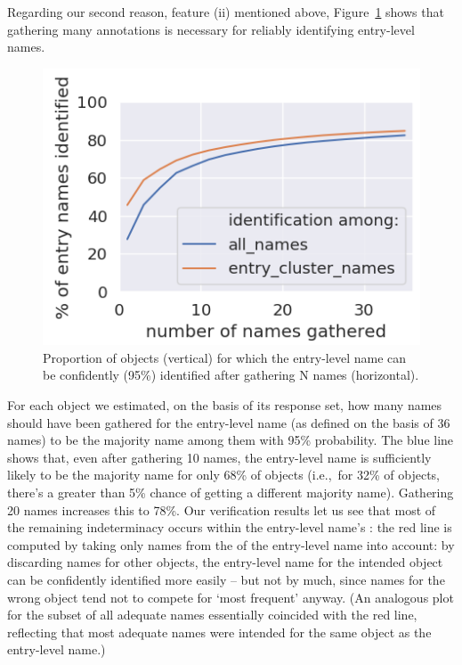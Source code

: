 Regarding our second reason, feature (ii) mentioned above, Figure~\ref{fig:entry-level-name-stability} shows that gathering many annotations is necessary for reliably identifying entry-level names.
\begin{figure}[t]
	\includegraphics[width=.9\columnwidth]{images/stability_analytic.png}
	\caption{Proportion of objects (vertical) for which the entry-level name can be confidently (95\%) identified after gathering N names (horizontal).}
	\label{fig:entry-level-name-stability}
\end{figure}
For each object we estimated, on the basis of its \mn response set, how many names should have been gathered for the entry-level name (as defined on the basis of 36 names) to be the majority name among them with 95\% probability.
The blue line shows that, even after gathering 10 names, the entry-level name is sufficiently likely to be the majority name for only 68\% of objects (i.e.,~for 32\% of objects, there's a greater than 5\% chance of getting a different majority name).
Gathering 20 names increases this to 78\%.
Our verification results let us see that most of the remaining indeterminacy occurs within the entry-level name's \cluster:
the red line is computed by taking only names from the \cluster of the entry-level name into account:
by discarding names for other objects, the entry-level name for the intended object can be confidently identified more easily -- but not by much, since names for the wrong object tend not to compete for `most frequent' anyway.
(An analogous plot for the subset of all adequate names essentially coincided with the red line, reflecting that most adequate names were intended for the same object as the entry-level name.)

